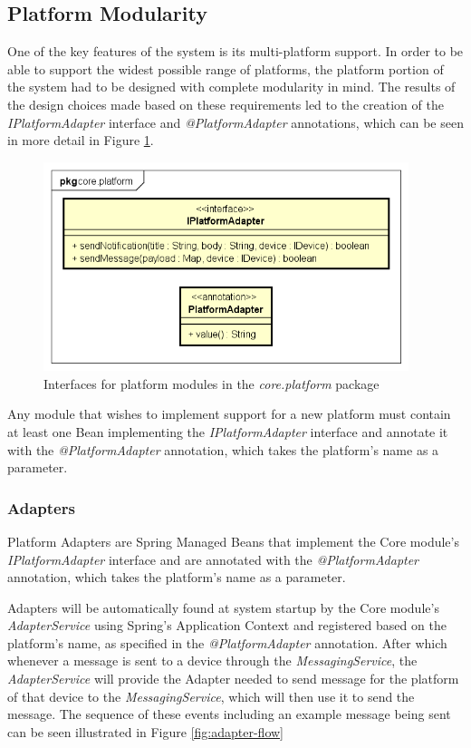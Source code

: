 \subsection{Platform Modularity}
One of the key features of the system is its multi-platform support. In order to be able to support the widest possible range of platforms, the platform portion of the system had to be designed with complete modularity in mind. The results of the design choices made based on these requirements led to the creation of the \textit{IPlatformAdapter} interface and \textit{@PlatformAdapter} annotations, which can be seen in more detail in Figure \ref{fig:core-platform-module}.

\begin{figure}[!ht]
	\centering
	\includegraphics[width=0.95\textwidth]{figures/03_design/core-platform-module}
    \caption{Interfaces for platform modules in the \textit{core.platform} package}
    \label{fig:core-platform-module}
\end{figure}

Any module that wishes to implement support for a new platform must contain at least one Bean implementing the \textit{IPlatformAdapter} interface and annotate it with the \textit{@PlatformAdapter} annotation, which takes the platform's name as a parameter.

\subsubsection{Adapters}\label{sec:adapters}
Platform Adapters are Spring Managed Beans that implement the Core module's \textit{IPlatformAdapter} interface and are annotated with the \textit{@PlatformAdapter} annotation, which takes the platform's name as a parameter. 

Adapters will be automatically found at system startup by the Core module's \textit{AdapterService} using Spring's Application Context and registered based on the platform's name, as specified in the \textit{@PlatformAdapter} annotation. After which whenever a message is sent to a device through the \textit{MessagingService}, the \textit{AdapterService} will provide the Adapter needed to send message for the platform of that device to the \textit{MessagingService}, which will then use it to send the message. The sequence of these events including an example message being sent can be seen illustrated in Figure \ref{fig:adapter-flow}

